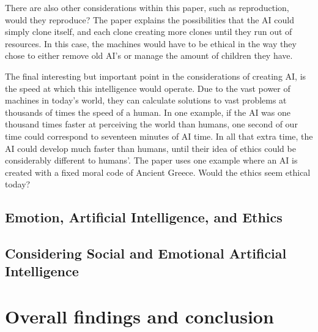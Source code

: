 \documentclass[article]{IEEEtran}
\begin{document}
There are also other considerations within this paper, such as reproduction, would they reproduce? The paper explains the possibilities that the AI could simply clone itself, and each clone creating more clones until they run out of resources. In this case, the machines would have to be ethical in the way they chose to either remove old AI’s or manage the amount of children they have.\par
The final interesting but important point in the considerations of creating AI, is the speed at which this intelligence would operate. Due to the vast power of machines in today’s world, they can calculate solutions to vast problems at thousands of times the speed of a human. In one example, if the AI was one thousand times faster at perceiving the world than humans, one second of our time could correspond to seventeen minutes of AI time. In all that extra time, the AI could develop much faster than humans, until their idea of ethics could be considerably different to humans’. The paper uses one example where an AI is created with a fixed moral code of Ancient Greece. Would the ethics seem ethical today?  

\subsection{Emotion, Artificial Intelligence, and Ethics}

\subsection{Considering Social and Emotional Artificial Intelligence}

\section{Overall findings and conclusion}
\end{document}

